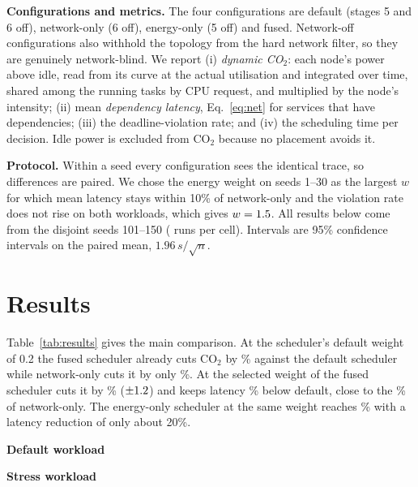 \documentclass[conference]{IEEEtran}
\begin{document}
\textbf{Configurations and metrics.} The four configurations are default (stages 5 and 6 off), network-only (6 off), energy-only (5 off) and fused. Network-off configurations also withhold the topology from the hard network filter, so they are genuinely network-blind. We report (i) \emph{dynamic CO$_2$}: each node's power above idle, read from its curve at the actual utilisation and integrated over time, shared among the running tasks by CPU request, and multiplied by the node's intensity; (ii) mean \emph{dependency latency}, Eq.~\eqref{eq:net} for services that have dependencies; (iii) the deadline-violation rate; and (iv) the scheduling time per decision. Idle power is excluded from CO$_2$ because no placement avoids it.

\textbf{Protocol.} Within a seed every configuration sees the identical trace, so differences are paired. We chose the energy weight on seeds 1--30 as the largest $w$ for which mean latency stays within 10\% of network-only and the violation rate does not rise on both workloads, which gives $w=1.5$. All results below come from the disjoint seeds 101--150 (\NSeeds{} runs per cell). Intervals are 95\% confidence intervals on the paired mean, $1.96\,s/\sqrt{n}$.

\section{Results}
\label{sec:results}
Table~\ref{tab:results} gives the main comparison. At the scheduler's default weight of 0.2 the fused scheduler already cuts CO$_2$ by \FusedLowW\% against the default scheduler while network-only cuts it by only \NetCO\%. At the selected weight of \HeadlineW{} the fused scheduler cuts it by \FusedCO\% ($\pm1.2$) and keeps latency \FusedLatCut\% below default, close to the \NetLatCut\% of network-only. The energy-only scheduler at the same weight reaches \EnergyOnlyCO\% with a latency reduction of only about 20\%.

\begin{table}[t]
\centering
\caption{Dynamic CO$_2$ (g per run, mean over \NSeeds{} seeds) and mean dependency latency. $\Delta$ is the paired change against the default scheduler; CO$_2$ changes carry a 95\% confidence interval. Rows below the rule use the selected weight.}
\label{tab:results}
\footnotesize
\setlength{\tabcolsep}{4pt}
\begin{minipage}[t]{0.49\textwidth}
\centering\textbf{Default workload}\\[2pt]

\end{minipage}\hfill
\begin{minipage}[t]{0.49\textwidth}
\centering\textbf{Stress workload}\\[2pt]

\end{minipage}
\end{table}
\end{document}
